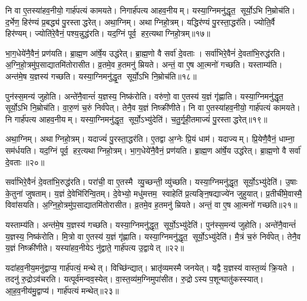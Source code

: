 नि वा ए॒तस्या॑हव॒नीयो॒ गार्\mbox{}ह॑पत्यं कामयते। निगार्\mbox{}ह॑पत्य आहव॒नीयम्। यस्या॒ग्निमनु॑द्धृत॒ सूर्यो॒ऽभि नि॒म्रोच॑ति। द॒र्भेण॒ हिर॑ण्यं प्र॒बद्ध्य॑ पु॒रस्ताद्धरेत्। अथा॒ग्निम्। अथाग्निहो॒त्रम्। यद्धिर॑ण्यं पु॒रस्ता॒द्धर॑ति। ज्योति॒र्वै हिर॑ण्यम्। ज्योति॑रे॒वैनं॒ पश्य॒न्नुद्ध॑रति। यद॒ग्निं पूर्व॒ हर॒त्यथाग्निहो॒त्रम्॥१७॥

भा॒ग॒धेये॑नै॒वैनं॒ प्रण॑यति। ब्रा॒ह्म॒ण आ॑र्\mbox{}षे॒य उद्ध॑रेत्। ब्रा॒ह्म॒णो वै सर्वा॑ दे॒वताः। सर्वा॑भिरे॒वैनं॑ दे॒वता॑भि॒रुद्ध॑रति। अ॒ग्नि॒हो॒त्रमु॑प॒साद्यातमि॑तोरासीत। व्र॒तमे॒व ह॒तमनु॑ म्रियते। अन्तं॒ वा ए॒ष आ॒त्मनो॑ गच्छति। यस्ताम्य॑ति। अन्त॑मे॒ष य॒ज्ञस्य॑ गच्छति। यस्या॒ग्निमनु॑द्धृ॒त सूर्यो॒ऽभि नि॒म्रोच॑ति॥१८॥

पुन॑स्स॒मन्य॑ जुहोति। अन्ते॑नै॒वान्तं॑ य॒ज्ञस्य॒ निष्क॑रोति। वरु॑णो॒ वा ए॒तस्य॑ य॒ज्ञं गृ॑ह्णाति। यस्या॒ग्निमनु॑द्धृत॒ सूर्यो॒ऽभि नि॒म्रोच॑ति। वा॒रु॒णं च॒रुं निर्व॑पेत्। तेनै॒व य॒ज्ञं निष्क्री॑णीते। नि वा ए॒तस्या॑हव॒नीयो॒ गार्\mbox{}ह॑पत्यं कामयते। नि गार्\mbox{}ह॑पत्य आहव॒नीयम्। यस्या॒ग्निमनु॑द्धृत॒ सूर्यो॒ऽभ्यु॑देति॑। च॒तु॒र्गृ॒ही॒तमाज्यं॑ पु॒रस्ताद्धरेत्॥१९॥

अथा॒ग्निम्। अथाग्निहो॒त्रम्। यदाज्यं॑ पु॒रस्ता॒द्धर॑ति। ए॒तद्वा अ॒ग्नेः प्रि॒यं धाम॑। यदाज्यम्। प्रि॒येणै॒वैनं॒ धाम्ना॒ सम॑र्धयति। यद॒ग्निं पूर्व॒ हर॒त्यथाग्निहो॒त्रम्। भा॒ग॒धेये॑नै॒वैनं॒ प्रण॑यति। ब्रा॒ह्म॒ण आ॑र्\mbox{}षे॒य उद्ध॑रेत्। ब्रा॒ह्म॒णो वै सर्वा॑ दे॒वताः॥२०॥

सर्वा॑भिरे॒वैनं॑ दे॒वता॑भि॒रुद्ध॑रति। परा॑ची॒ वा ए॒तस्मै व्यु॒च्छन्ती॒ व्यु॑च्छति। यस्या॒ग्निमनु॑द्धृत॒ सूर्यो॒ऽभ्यु॑देति॑। उ॒षाः के॒तुना॑ जुषताम्। य॒ज्ञं दे॒वेभि॑रिन्वि॒तम्। दे॒वेभ्यो॒ मधु॑मत्तम॒ स्वाहेति॑ प्र॒त्यङ्नि॒षद्याज्ये॑न जुहुयात्। प्र॒तीची॑मे॒वास्मै॒ विवा॑सयति। अ॒ग्नि॒हो॒त्रमु॑प॒साद्यातमि॑तोरासीत। व्र॒तमे॒व ह॒तमनु॑ म्रियते। अन्तं॒ वा ए॒ष आ॒त्मनो॑ गच्छति॥२१॥

यस्ताम्य॑ति। अन्त॑मे॒ष य॒ज्ञस्य॑ गच्छति। यस्या॒ग्निमनु॑द्धृत॒ सूर्यो॒ऽभ्यु॑देति॑। पुन॑स्स॒मन्य॑ जुहोति। अन्ते॑नै॒वान्तं॑ य॒ज्ञस्य॒ निष्क॑रोति। मि॒त्रो वा ए॒तस्य॑ य॒ज्ञं गृ॑ह्णाति। यस्या॒ग्निमनु॑द्धृत॒ सूर्यो॒ऽभ्यु॑देति॑। मै॒त्रं च॒रुं निर्व॑पेत्। तेनै॒व य॒ज्ञं निष्क्री॑णीते। यस्या॑हव॒नीयेऽ नु॑द्वाते॒ गार्\mbox{}ह॑पत्य उ॒द्वायेत् ॥२२॥

यदा॑हव॒नीय॒मनु॑द्वाप्य॒ गार्\mbox{}ह॑पत्यं॒ मन्थेत्। विच्छि॑न्द्यात्। भ्रातृ॑व्यमस्मै जनयेत्। यद्वै य॒ज्ञस्य॑ वास्त॒व्यं॑ क्रि॒यते। तदनु॑ रु॒द्रोऽव॑चरति। यत्पूर्व॑मन्वव॒स्येत्। वा॒स्त॒व्य॑म॒ग्निमुपा॑सीत। रु॒द्रोऽस्य प॒शून्घातु॑कस्स्यात्। आ॒ह॒व॒नीय॑मु॒द्वाप्य॑। गार्\mbox{}ह॑पत्यं मन्थेत्॥२३॥

